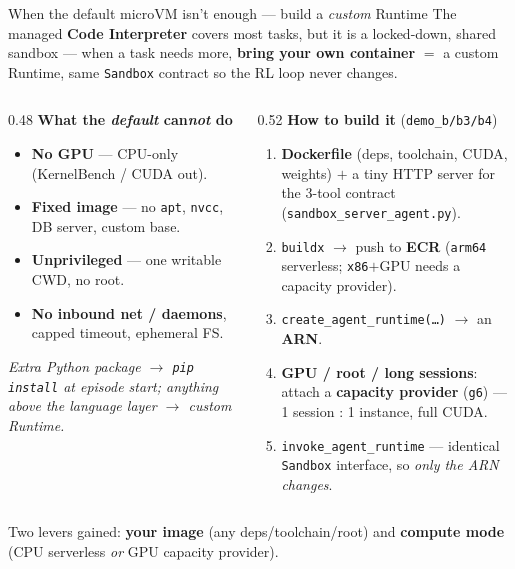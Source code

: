 \documentclass[aspectratio=169]{beamer}
\begin{document}
\begin{frame}{When the default microVM isn't enough --- build a \emph{custom} Runtime}
  \footnotesize The managed \textbf{Code Interpreter} covers most tasks, but it is a locked-down, shared
  sandbox --- when a task needs more, \textbf{bring your own container} $=$ a custom Runtime, same
  \texttt{Sandbox} contract so the RL loop never changes.
  \begin{columns}[T]
    \begin{column}{0.48\textwidth}
      \textbf{What the \emph{default} can\emph{not} do}
      \begin{itemize}\setlength\itemsep{0.03em}
        \item \textbf{No GPU} --- CPU-only (KernelBench / CUDA out).
        \item \textbf{Fixed image} --- no \texttt{apt}, \texttt{nvcc}, DB server, custom base.
        \item \textbf{Unprivileged} --- one writable CWD, no root.
        \item \textbf{No inbound net / daemons}, capped timeout, ephemeral FS.
      \end{itemize}
      {\scriptsize\itshape Extra \emph{Python package} $\to$ \texttt{pip install} at episode start; anything
        \emph{above} the language layer $\to$ custom Runtime.}
    \end{column}
    \begin{column}{0.52\textwidth}
      \textbf{How to build it} (\texttt{demo\_b/b3/b4})
      \begin{enumerate}\setlength\itemsep{0.03em}
        \item[\textbf{1}] \textbf{Dockerfile} (deps, toolchain, CUDA, weights) $+$ a tiny HTTP server for
          the 3-tool contract (\texttt{sandbox\_server\_agent.py}).
        \item[\textbf{2}] \texttt{buildx} $\to$ push to \textbf{ECR} (\texttt{arm64} serverless; \texttt{x86}$+$GPU needs a capacity provider).
        \item[\textbf{3}] \texttt{create\_agent\_runtime(\ldots)} $\to$ an \textbf{ARN}.
        \item[\textbf{4}] \textbf{GPU / root / long sessions}: attach a \textbf{capacity provider} (\texttt{g6}) --- 1 session : 1 instance, full CUDA.
        \item[\textbf{5}] \texttt{invoke\_agent\_runtime} --- identical \texttt{Sandbox} interface, so \emph{only the ARN changes}.
      \end{enumerate}
    \end{column}
  \end{columns}
  \vspace{0.1em}
  {\scriptsize Two levers gained: \textbf{your image} (any deps/toolchain/root) and \textbf{compute mode}
  (CPU serverless \emph{or} GPU capacity provider).}
\end{frame}
\end{document}
